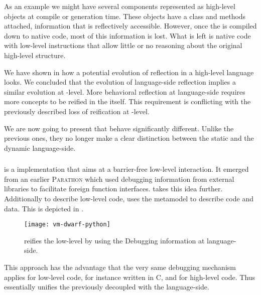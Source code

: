 As an example we might have several \VM components represented as high-level objects at compile or \VM generation time.
These objects have a class and methods attached, information that is reflectively accessible.
However, once the \VM is compiled down to native code, most of this information is lost.
What is left is native code with low-level instructions that allow little or no reasoning about the original high-level structure.

We have shown in  how a potential evolution of reflection in a high-level language looks.
We concluded that the evolution of language-side reflection implies a similar evolution at \VM-level.
More behavioral reflection at language-side requires more concepts to be reified in the \VM itself.
This requirement is conflicting with the previously described loss of reification at \VM-level.

We are now going to present \VMs that behave significantly different.
Unlike the previous ones, they no longer make a clear distinction between the static \VM and the dynamic language-side.


\subsubsection*{\DwarfPython}

\DwarfPython \cite{Kell11a} is a \Python implementation that aims at a barrier-free low-level interaction.
It emerged from an earlier \textsc{Parathon} which used \Dwarf debugging information from external libraries to facilitate foreign function interfaces.
\DwarfPython takes this idea further.
Additionally to describe low-level code, \DwarfPython uses the \Dwarf metamodel to describe \Python code and data.
This is depicted in .
%
\begin{figure}[h]
	\centering
	\texttt{[image: vm-dwarf-python]}
	\caption[\DwarfPython Low-level Reification]{\DwarfPython reifies the low-level \VM by using the \Dwarf Debugging information at language-side.}
\end{figure}
%
This approach has the advantage that the very same debugging mechanism applies for low-level code, for instance written in C, and for high-level \Python code.
Thus \DwarfPython essentially unifies the previously decoupled \VM with the language-side.

